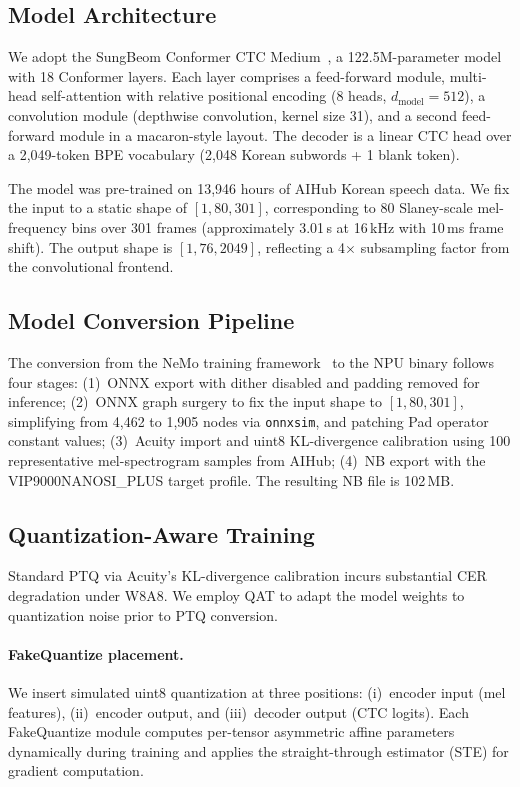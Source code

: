 \documentclass[a4paper,11pt,twocolumn]{article}
\begin{document}
\subsection{Model Architecture}

We adopt the SungBeom Conformer CTC Medium~\cite{sungbeom}, a 122.5M-parameter model with 18 Conformer layers. Each layer comprises a feed-forward module, multi-head self-attention with relative positional encoding (8 heads, $d_\text{model}{=}512$), a convolution module (depthwise convolution, kernel size 31), and a second feed-forward module in a macaron-style layout. The decoder is a linear CTC head over a 2,049-token BPE vocabulary (2,048 Korean subwords + 1 blank token).

The model was pre-trained on 13,946 hours of AIHub Korean speech data. We fix the input to a static shape of $[1, 80, 301]$, corresponding to 80 Slaney-scale mel-frequency bins over 301 frames (approximately 3.01\,s at 16\,kHz with 10\,ms frame shift). The output shape is $[1, 76, 2049]$, reflecting a 4$\times$ subsampling factor from the convolutional frontend.

\subsection{Model Conversion Pipeline}

The conversion from the NeMo training framework~\cite{nemo} to the NPU binary follows four stages: (1)~ONNX export with dither disabled and padding removed for inference; (2)~ONNX graph surgery to fix the input shape to $[1, 80, 301]$, simplifying from 4,462 to 1,905 nodes via \texttt{onnxsim}, and patching Pad operator constant values; (3)~Acuity import and uint8 KL-divergence calibration using 100 representative mel-spectrogram samples from AIHub; (4)~NB export with the VIP9000NANOSI\_PLUS target profile. The resulting NB file is 102\,MB.

\subsection{Quantization-Aware Training}

Standard PTQ via Acuity's KL-divergence calibration incurs substantial CER degradation under W8A8. We employ QAT to adapt the model weights to quantization noise prior to PTQ conversion.

\paragraph{FakeQuantize placement.}
We insert simulated uint8 quantization at three positions: (i)~encoder input (mel features), (ii)~encoder output, and (iii)~decoder output (CTC logits). Each FakeQuantize module computes per-tensor asymmetric affine parameters dynamically during training and applies the straight-through estimator (STE) for gradient computation.
\end{document}
